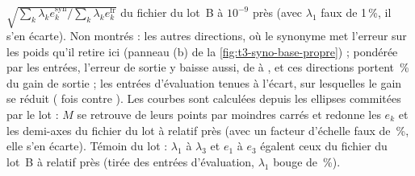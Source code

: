 {$\sqrt{\sum_k\lambda_k e_k^{\mathrm{syn}}/\sum_k\lambda_k e_k^{\mathrm{fr}}}$ du fichier du lot~B à $10^{-9}$ près
(avec $\lambda_1$ faux de 1\,\%, il s'en écarte). Non montrés : les \LatNuageAutresDirections{} autres directions, où le
synonyme met l'erreur sur les poids qu'il retire ici (panneau (b) de la \cref{fig:t3-syno-base-propre}) ; pondérée par les entrées, l'erreur de
sortie y baisse aussi, de \LatNuageAutresF{} à \LatNuageAutresS, et ces directions portent \LatNuageAutresPartGain\,\%
du gain de sortie ; les entrées d'évaluation tenues à l'écart, sur lesquelles le
gain se réduit (\LatSpecEvalRapport{} fois contre \LatSpecCalibRapport). Les courbes sont calculées depuis les
ellipses commitées par le lot : $M$ se retrouve de leurs \LatNuageEllipsePoints{} points par moindres carrés et redonne les $e_k$ et les
demi-axes du fichier du lot à \LatNuageAppuiTemoin{} relatif près (avec un facteur d'échelle faux de \LatNuageCasseF\,\%, elle s'en
écarte). Témoin du lot : $\lambda_1$ à $\lambda_3$ et $e_1$ à $e_3$ égalent ceux du fichier du lot~B à
\LatNuageTemoin{} relatif près (tirée des entrées d'évaluation, $\lambda_1$ bouge de \LatNuageCassure\,\%).}
\fi
